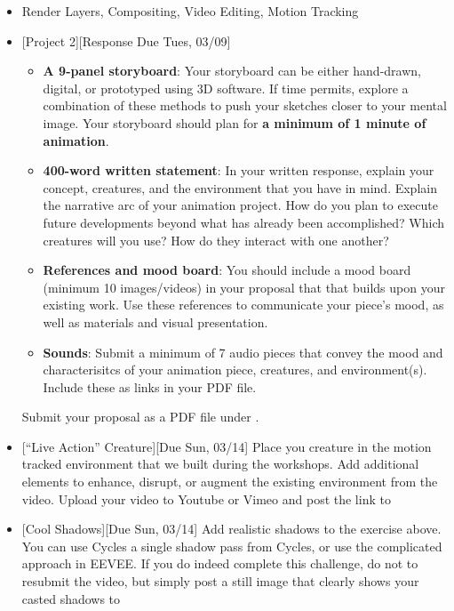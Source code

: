\def\dMon{Mon, 03/08}
\def\dTues{Tues, 03/09}
\def\dWed{Wed, 03/10}
\def\dThur{Thur, 03/11}
\def\dFri{Fri, 03/12}
\def\dSat{Sat, 03/13}
\def\dSun{Sun, 03/14}
\placeDate

\begin{itemize}[noitemsep,topsep=0pt,leftmargin=*]
    \item {} Render Layers, Compositing, Video Editing, Motion Tracking
    \item {}[Project 2][Response Due \dTues]
    \begin{itemize}
        \item \textbf{A 9-panel storyboard}: Your storyboard can be either hand-drawn, digital, or prototyped using 3D software. If time permits, explore a combination of these methods to push your sketches closer to your mental image. Your storyboard should plan for \textbf{a minimum of 1 minute of animation}.
        \item \textbf{400-word written statement}: In your written response, explain your concept, creatures, and the environment that you have in mind. Explain the narrative arc of your animation project. How do you plan to execute future developments beyond what has already been accomplished? Which creatures will you use? How do they interact with one another?
        \item \textbf{References and mood board}: You should include a mood board (minimum 10 images/videos) in your proposal that that builds upon your existing work. Use these references to communicate your piece's mood, as well as materials and visual presentation.
        \item \textbf{Sounds}: Submit a minimum of 7 audio pieces that convey the mood and characterisitcs of your animation piece, creatures, and environment(s). Include these as links in your PDF file.
    \end{itemize}
    Submit your proposal as a PDF file under .
    \item {}[``Live Action'' Creature][Due \dSun] Place you creature in the motion tracked environment that we built during the workshops. Add additional elements to enhance, disrupt, or augment the existing environment from the video. Upload your video to Youtube or Vimeo and post the link to \discordE
    \item {}[Cool Shadows][Due \dSun] Add realistic shadows to the exercise above. You can use Cycles a single shadow pass from Cycles, or use the complicated approach in EEVEE. If you do indeed complete this challenge, do not to resubmit the video, but simply post a still image that clearly shows your casted shadows to \discordC
\end{itemize}